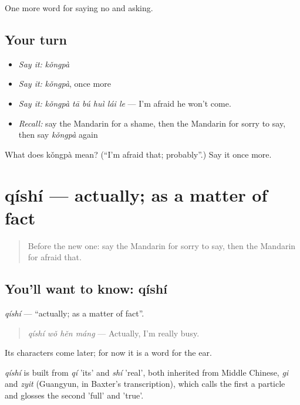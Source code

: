 \begin{grammarlens}[title={What you've built}]
One more word for saying no and asking.
\end{grammarlens}

\subsection*{Your turn}
\begin{itemize}
\raggedright
  \item \emph{Say it:} \emph{kǒngpà}
  \item \emph{Say it:} \emph{kǒngpà}, once more
  \item \emph{Say it:} \emph{kǒngpà tā bú huì lái le} — I'm afraid he won't come.
  \item \emph{Recall:} say the Mandarin for a shame, then the Mandarin for sorry to say, then say \emph{kǒngpà} again
\end{itemize}

\begin{tcolorbox}[breakable,colback=teal!4,colframe=teal!35!black,title={Before you move on}]
What does kǒngpà mean? (\textquotedblleft{}I'm afraid that; probably\textquotedblright{}.) Say it once more.
\end{tcolorbox}
\section[qíshí]{qíshí — actually; as a matter of fact}

\label{lesson:ZH-C264-qishi}



\begin{quote}
Before the new one: say the Mandarin for sorry to say, then the Mandarin for afraid that.
\end{quote}

\subsection*{You'll want to know: qíshí}
\emph{qíshí} — \textquotedblleft{}actually; as a matter of fact\textquotedblright{}.

\begin{quote}
\emph{qíshí wǒ hěn máng} — Actually, I'm really busy.
\end{quote}

Its characters come later; for now it is a word for the ear.

\begin{cousinweb}
\emph{qíshí} is built from \emph{qí} 'its' and \emph{shí} 'real', both inherited from Middle Chinese, \emph{gi} and \emph{zyit} (Guangyun, in Baxter's transcription), which calls the first a particle and glosses the second 'full' and 'true'.
\end{cousinweb}

